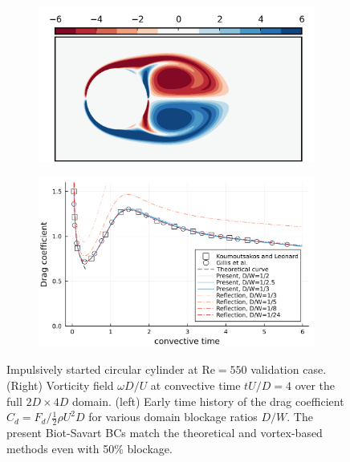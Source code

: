 \documentclass[final,1p,times]{elsarticle}
\begin{document}
\begin{figure}
    \centering
    \begin{subfigure}{.45\textwidth}
        \hspace{-5mm}
        \includegraphics[width=\textwidth]{tex//fig/ImpCircle_4_vort.png}
        \vspace{5mm}
    \end{subfigure}%
    \begin{subfigure}{.5\textwidth}
        \centering
        \includegraphics[width=\textwidth]{tex//fig/ImpCircle_Cd.png}
    \end{subfigure}%
    \caption{Impulsively started circular cylinder at $\text{Re}=550$ validation case. (Right) Vorticity field $\omega D/U$ at convective time $tU/D=4$ over the full $2D\times 4D$ domain. (left) Early time history of the drag coefficient $C_d=F_d/\frac 12 \rho U^2 D$ for various domain blockage ratios $D/W$. The present Biot-Savart BCs match the theoretical and vortex-based methods even with 50\% blockage.
    }
    \label{fig:cylinder_force}
\end{figure}
\end{document}

